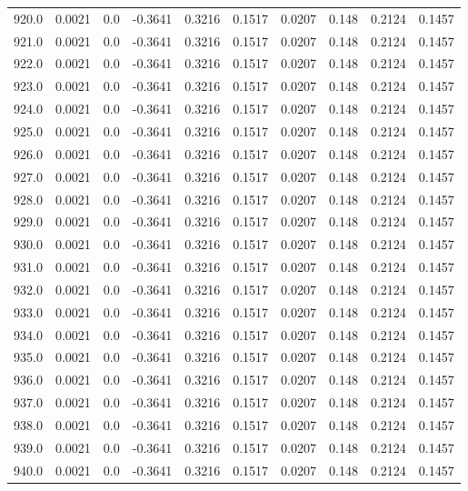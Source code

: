 \begin{longtable}{lrrrrrrrrr}
920.0 & 0.0021 & 0.0 & -0.3641 & 0.3216 & 0.1517 & 0.0207 & 0.148 & 0.2124 & 0.1457 \\
921.0 & 0.0021 & 0.0 & -0.3641 & 0.3216 & 0.1517 & 0.0207 & 0.148 & 0.2124 & 0.1457 \\
922.0 & 0.0021 & 0.0 & -0.3641 & 0.3216 & 0.1517 & 0.0207 & 0.148 & 0.2124 & 0.1457 \\
923.0 & 0.0021 & 0.0 & -0.3641 & 0.3216 & 0.1517 & 0.0207 & 0.148 & 0.2124 & 0.1457 \\
924.0 & 0.0021 & 0.0 & -0.3641 & 0.3216 & 0.1517 & 0.0207 & 0.148 & 0.2124 & 0.1457 \\
925.0 & 0.0021 & 0.0 & -0.3641 & 0.3216 & 0.1517 & 0.0207 & 0.148 & 0.2124 & 0.1457 \\
926.0 & 0.0021 & 0.0 & -0.3641 & 0.3216 & 0.1517 & 0.0207 & 0.148 & 0.2124 & 0.1457 \\
927.0 & 0.0021 & 0.0 & -0.3641 & 0.3216 & 0.1517 & 0.0207 & 0.148 & 0.2124 & 0.1457 \\
928.0 & 0.0021 & 0.0 & -0.3641 & 0.3216 & 0.1517 & 0.0207 & 0.148 & 0.2124 & 0.1457 \\
929.0 & 0.0021 & 0.0 & -0.3641 & 0.3216 & 0.1517 & 0.0207 & 0.148 & 0.2124 & 0.1457 \\
930.0 & 0.0021 & 0.0 & -0.3641 & 0.3216 & 0.1517 & 0.0207 & 0.148 & 0.2124 & 0.1457 \\
931.0 & 0.0021 & 0.0 & -0.3641 & 0.3216 & 0.1517 & 0.0207 & 0.148 & 0.2124 & 0.1457 \\
932.0 & 0.0021 & 0.0 & -0.3641 & 0.3216 & 0.1517 & 0.0207 & 0.148 & 0.2124 & 0.1457 \\
933.0 & 0.0021 & 0.0 & -0.3641 & 0.3216 & 0.1517 & 0.0207 & 0.148 & 0.2124 & 0.1457 \\
934.0 & 0.0021 & 0.0 & -0.3641 & 0.3216 & 0.1517 & 0.0207 & 0.148 & 0.2124 & 0.1457 \\
935.0 & 0.0021 & 0.0 & -0.3641 & 0.3216 & 0.1517 & 0.0207 & 0.148 & 0.2124 & 0.1457 \\
936.0 & 0.0021 & 0.0 & -0.3641 & 0.3216 & 0.1517 & 0.0207 & 0.148 & 0.2124 & 0.1457 \\
937.0 & 0.0021 & 0.0 & -0.3641 & 0.3216 & 0.1517 & 0.0207 & 0.148 & 0.2124 & 0.1457 \\
938.0 & 0.0021 & 0.0 & -0.3641 & 0.3216 & 0.1517 & 0.0207 & 0.148 & 0.2124 & 0.1457 \\
939.0 & 0.0021 & 0.0 & -0.3641 & 0.3216 & 0.1517 & 0.0207 & 0.148 & 0.2124 & 0.1457 \\
940.0 & 0.0021 & 0.0 & -0.3641 & 0.3216 & 0.1517 & 0.0207 & 0.148 & 0.2124 & 0.1457 \\

\end{longtable}
